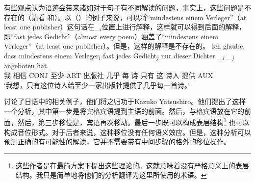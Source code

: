 \noindent
有些观点认为语迹会带来诸如对于句子有不同解读的问题，事实上，这些问题是不存在的（请看\citealp[]{Kiss2001a} 和\citealp[Section~2.6]{Fanselow2001a}）。以（）的例子来说，可以将“mindestens einem Verleger”（at least one publisher）这句话在\_$_i$位置上进行解释，这样就可以得到后面的解释，即“fast jedes Gedicht”（almost every poem）涵盖了“mindestens einem Verleger”（at least one publisher）。但是，这样的解释是不存在的。
\ea
\gll Ich glaube, dass mindestens einem Verleger$_i$ fast jedes Gedicht$_j$ nur dieser Dichter \_$_i$ \_$_j$ angeboten hat.\\
	 我 相信 CONJ 至少 ART 出版社 几乎 每 诗 只有 这 诗人 {} {} 提供 AUX\\
\glt `我想，只有这位诗人给至少一家出版社提供了几乎每一首诗。'
\z

\citet[]{SE2002a} 讨论了日语中的相关例子，他们将之归功于Kazuko 
Yatsushiro。他们提出了这样一个分析，其中第一步是将宾格宾语提到主语的前面。然后，与格宾语放在它的前面，然后，第三步移位是，宾语再次移动。最后一步既可以构成表层结构\footnote{
   这些作者是在最简方案下提出这些理论的。这就意味着没有严格意义上的表层结构。我只是简单地将他们的分析翻译为这里所使用的术语。
}
也可以构成音位形式。对于后者来说，这种移位没有任何语义效应。但是，这种分析可以预测正确的有可能性的解读，它并不需要带有中间步骤的格外的移位操作。

